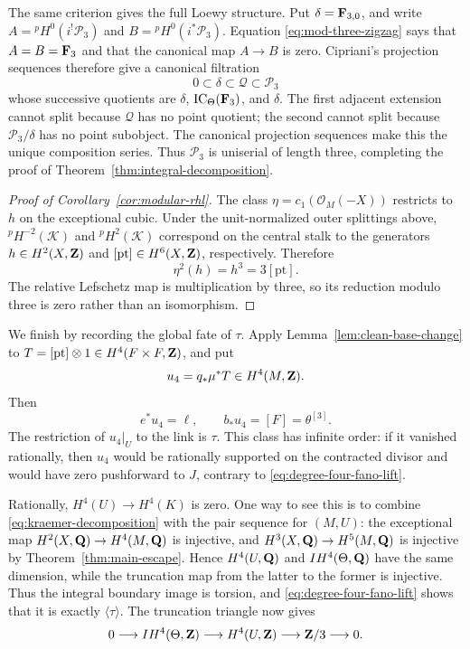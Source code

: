 The same criterion gives the full Loewy structure.  Put
\(\delta=\mathbf F_{3,0}\), and write
\(A={}^pH^0(i^!\mathcal P_3)\) and
\(B={}^pH^0(i^*\mathcal P_3)\).  Equation
\eqref{eq:mod-three-zigzag} says that \(A=B=\mathbf F_3\) and that the canonical
map \(A\to B\) is zero.  Cipriani's projection sequences therefore give a
canonical filtration
\[
 0\subset\delta\subset\mathcal Q
   \subset\mathcal P_3
\]
whose successive quotients are
\(\delta\), \(\operatorname{IC}_\Theta(\mathbf F_3)\), and \(\delta\).  The first adjacent
extension cannot split because \(\mathcal Q\) has no point quotient; the
second cannot split because \(\mathcal P_3/\delta\) has no point subobject.
The canonical projection sequences make this the unique composition series.
Thus \(\mathcal P_3\) is uniserial of length three, completing the proof of
Theorem~\ref{thm:integral-decomposition}.

\begin{proof}[Proof of Corollary~\ref{cor:modular-rhl}]
The class \(\eta=c_1(\mathcal O_M(-X))\) restricts to \(h\) on the
exceptional cubic.  Under the unit-normalized outer splittings above,
\({}^pH^{-2}(\mathcal K)\) and \({}^pH^2(\mathcal K)\) correspond on the
central stalk to the generators \(h\in H^2(X,\mathbf Z)\) and
\([\mathrm{pt}]\in H^6(X,\mathbf Z)\), respectively.  Therefore
\[
 \eta^2(h)=h^3=3[\mathrm{pt}].
\]
The relative Lefschetz map is multiplication by three, so its reduction
modulo three is zero rather than an isomorphism.
\end{proof}

We finish by recording the global fate of \(\tau\).  Apply
Lemma~\ref{lem:clean-base-change} to
\(T=[\mathrm{pt}]\otimes1\in H^4(F\times F,\mathbf Z)\), and put
\[
 u_4=q_*\mu^*T\in H^4(M,\mathbf Z).
\]
Then
\begin{equation}\label{eq:degree-four-fano-lift}
 e^*u_4=\ell,\qquad b_*u_4=[F]=\theta^{[3]}.
\end{equation}
The restriction of \(u_4|_U\) to the link is \(\tau\).  This class has
infinite order: if it vanished rationally, then \(u_4\) would be rationally
supported on the contracted divisor and would have zero pushforward to
\(J\), contrary to \eqref{eq:degree-four-fano-lift}.

Rationally, \(H^4(U)\to H^4(K)\) is zero.  One way to see this is to combine
\eqref{eq:kraemer-decomposition} with the pair sequence for \((M,U)\): the
exceptional map \(H^2(X,\mathbf Q)\to H^4(M,\mathbf Q)\) is injective, and
\(H^3(X,\mathbf Q)\to H^5(M,\mathbf Q)\) is injective by
Theorem~\ref{thm:main-escape}.  Hence \(H^4(U,\mathbf Q)\) and
\(IH^4(\Theta,\mathbf Q)\) have the same dimension, while the truncation map from
the latter to the former is injective.  Thus the integral boundary image is
torsion, and \eqref{eq:degree-four-fano-lift} shows that it is exactly
\(\langle\tau\rangle\).  The truncation triangle now gives
\begin{equation}\label{eq:degree-four-index-three}
 0\longrightarrow IH^4(\Theta,\mathbf Z)\longrightarrow H^4(U,\mathbf Z)
 \longrightarrow\mathbf Z/3\longrightarrow0.
\end{equation}


